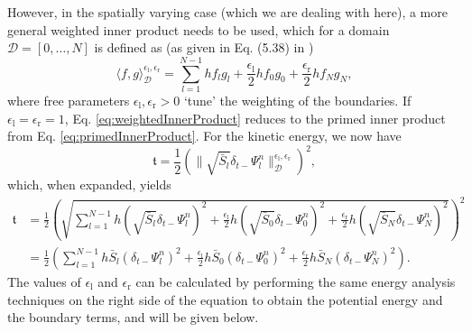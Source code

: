 \documentclass[dvipsnames]{article}
\def\Psiln{\Psi_l^n}
\begin{document}
However, in the spatially varying case (which we are dealing with here), a more general weighted inner product needs to be used, which for a domain $\mathcal{D} = [0,\hdots,N]$ is defined as (as given in Eq. (5.38) in \cite{Bilbao2009}) 
\begin{equation}\label{eq:weightedInnerProduct}
    \langle f,g \rangle_{\mathcal{D}}^{\epsilon_\text{l}, \epsilon_\text{r}}= \sum_{l = 1}^{N-1}hf_lg_l + \frac{\epsilon_\text{l}}{2}hf_0g_0 + \frac{\epsilon_\text{r}}{2}hf_Ng_N,
\end{equation}
where free parameters $\epsilon_\text{l}, \epsilon_\text{r} > 0$ `tune' the weighting of the boundaries. If $\epsilon_\text{l} = \epsilon_\text{r} = 1$, Eq. \eqref{eq:weightedInnerProduct} reduces to the primed inner product from Eq. \eqref{eq:primedInnerProduct}. For the kinetic energy, we now have
\begin{equation}
    \mathfrak{t} = \frac{1}{2}\left(\lVert\sqrt{\bar S_l}\delta_{t-}\Psiln \rVert_\mathcal{D}^{\epsilon_\text{l}, \epsilon_\text{r}}\right)^2,
\end{equation}
which, when expanded, yields
\begin{align}
    \mathfrak{t} &= \frac{1}{2}\left(\sqrt{\sum_{l=1}^{N-1}h\left(\sqrt{\bar S_l}\delta_{t-}\Psiln\right)^2 + \frac{\epsilon_\text{l}}{2}h\left(\sqrt{\bar S_0 }\delta_{t-}\Psi_0^n\right)^2 + \frac{\epsilon_\text{r}}{2}h\left(\sqrt{\bar S_N }\delta_{t-}\Psi_N^n\right)^2}\right)^2\nonumber\\
     &=\frac{1}{2}\left(\sum_{l=1}^{N-1}h\bar S_l(\delta_{t-}\Psiln)^2 + \frac{\epsilon_\text{l}}{2}h\bar S_0 (\delta_{t-}\Psi_0^n)^2 + \frac{\epsilon_\text{r}}{2}h\bar S_N (\delta_{t-}\Psi_N^n)^2\right)    .
\end{align}
The values of $\epsilon_\text{l}$ and $\epsilon_\text{r}$ can be calculated by performing the same energy analysis techniques on the right side of the equation to obtain the potential energy and the boundary terms, and will be given below.
\end{document}
